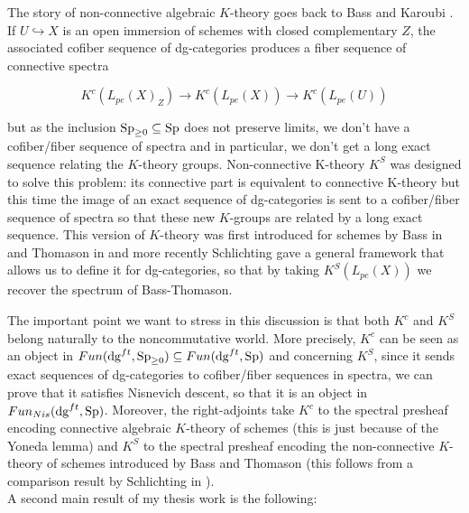 \begin{refsection}
The story of non-connective algebraic $K$-theory goes back to Bass \cite{MR0249491} and Karoubi \cite{MR0233871}. If $U\hookrightarrow X$ is an open immersion of schemes with closed complementary $Z$, the associated cofiber sequence of dg-categories produces a fiber sequence of connective spectra

$$K^c(L_{pe}(X)_Z)\to K^c(L_{pe}(X))\to K^c(L_{pe}(U))$$

\noindent but as the inclusion $\mathrm{Sp}_{\geq 0}\subseteq \mathrm{Sp}$ does not preserve limits,  we don't have a cofiber/fiber sequence of spectra and in particular, we don't get a long exact sequence relating the $K$-theory groups. Non-connective K-theory $K^S$ was designed to solve this problem: its connective part is equivalent to connective K-theory but this time the image of an exact sequence of dg-categories is sent to a cofiber/fiber sequence of spectra so that these new $K$-groups are related by a long exact sequence. This version of $K$-theory was first introduced for schemes by Bass in \cite{MR0249491} and Thomason in \cite{thomasonalgebraic} and more recently Schlichting \cite{schlichting-negative} gave a general framework that allows us to define it for dg-categories, so that by taking $K^S(L_{pe}(X))$ we recover the spectrum of Bass-Thomason. 

The important point we want to stress in this discussion is that both $K^c$ and $K^S$ belong naturally to the noncommutative world. More precisely, $K^c$ can be seen as an object in $Fun(\mathrm{dg}^{ft}, \mathrm{Sp}_{\geq 0})\subseteq Fun(\mathrm{dg}^{ft}, \mathrm{Sp})$ and concerning $K^S$, since it sends exact sequences of dg-categories to cofiber/fiber sequences in spectra, we can prove that it satisfies Nisnevich descent, so that it is an object in $Fun_{Nis}(\mathrm{dg}^{ft}, \mathrm{Sp})$. Moreover, the right-adjoints take $K^c$ to the spectral presheaf encoding connective algebraic $K$-theory of schemes (this is just because of the Yoneda lemma) and $K^S$ to the spectral presheaf encoding the non-connective $K$-theory of schemes introduced by Bass and Thomason (this follows from a comparison result by Schlichting in \cite{schlichting-negative}).\\ 

A second main result of my thesis work is the following:


\begin{thm}
\hfill 
\begin{itemize}


\end{itemize}
\end{thm}
\end{refsection}
